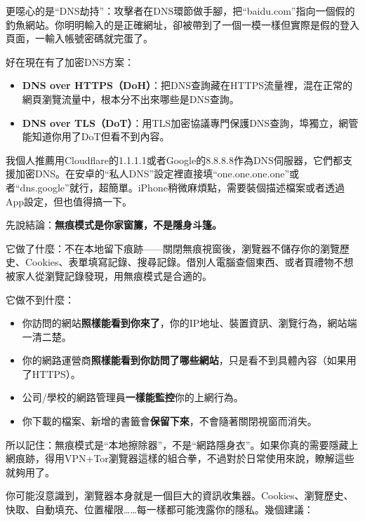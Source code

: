 更噁心的是“DNS劫持”：攻擊者在DNS環節做手腳，把“baidu.com”指向一個假的釣魚網站。你明明輸入的是正確網址，卻被帶到了一個一模一樣但實際是假的登入頁面，一輸入帳號密碼就完蛋了。

好在現在有了加密DNS方案：

\begin{itemize}
  \item \textbf{DNS over HTTPS（DoH）}：把DNS查詢藏在HTTPS流量裡，混在正常的網頁瀏覽流量中，根本分不出來哪些是DNS查詢。
  \item \textbf{DNS over TLS（DoT）}：用TLS加密協議專門保護DNS查詢，埠獨立，網管能知道你用了DoT但看不到內容。
\end{itemize}

我個人推薦用Cloudflare的1.1.1.1或者Google的8.8.8.8作為DNS伺服器，它們都支援加密DNS。在安卓的“私人DNS”設定裡直接填“one.one.one.one”或者“dns.google”就行，超簡單。iPhone稍微麻煩點，需要裝個描述檔案或者透過App設定，但也值得搞一下。


先說結論：\textbf{無痕模式是你家窗簾，不是隱身斗篷。}

它做了什麼：不在本地留下痕跡——關閉無痕視窗後，瀏覽器不儲存你的瀏覽歷史、Cookies、表單填寫記錄、搜尋記錄。借別人電腦查個東西、或者買禮物不想被家人從瀏覽記錄發現，用無痕模式是合適的。

它做不到什麼：

\begin{itemize}
  \item 你訪問的網站\textbf{照樣能看到你來了}，你的IP地址、裝置資訊、瀏覽行為，網站端一清二楚。
  \item 你的網路運營商\textbf{照樣能看到你訪問了哪些網站}，只是看不到具體內容（如果用了HTTPS）。
  \item 公司/學校的網路管理員\textbf{一樣能監控}你的上網行為。
  \item 你下載的檔案、新增的書籤會\textbf{保留下來}，不會隨著關閉視窗而消失。
\end{itemize}

所以記住：無痕模式是“本地擦除器”，不是“網路隱身衣”。如果你真的需要隱藏上網痕跡，得用VPN+Tor瀏覽器這樣的組合拳，不過對於日常使用來說，瞭解這些就夠用了。


你可能沒意識到，瀏覽器本身就是一個巨大的資訊收集器。Cookies、瀏覽歷史、快取、自動填充、位置權限……每一樣都可能洩露你的隱私。幾個建議：

